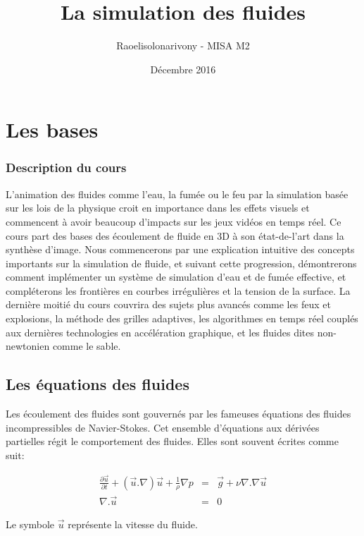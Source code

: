 \documentclass[11pt]{report}
\title{La simulation des fluides}
\author{Raoelisolonarivony - MISA M2}
\date{Décembre 2016}
\begin{document}
\maketitle
\part{Les bases}

\section*{Description du cours}

L'animation des fluides comme l'eau, la fumée ou le feu par la simulation basée sur les lois de la physique croit en importance dans les effets visuels et commencent à avoir beaucoup d'impacts sur les jeux vidéos en temps réel. Ce cours part des bases des écoulement de fluide en 3D à son état-de-l'art dans la synthèse d'image. Nous commencerons par une explication intuitive des concepts importants sur la simulation de fluide, et suivant cette progression, démontrerons comment implémenter un système de simulation d'eau et de fumée effective, et compléterons les frontières en courbes irrégulières et  la tension de la surface. La dernière moitié du cours couvrira des sujets plus avancés comme les feux et explosions, la méthode des grilles adaptives, les algorithmes en temps réel couplés aux dernières technologies en accélération graphique, et les fluides dites non-newtonien comme le sable. 

\chapter{Les équations des fluides}
Les écoulement des fluides sont gouvernés par les fameuses équations des fluides incompressibles de Navier-Stokes. Cet ensemble d'équations aux dérivées partielles régit le comportement des fluides. Elles sont souvent écrites comme suit:

\begin{eqnarray}
\frac{\partial \overrightarrow{u}}{\partial t} + (\overrightarrow{u} . \nabla ) \overrightarrow{u} + \frac{1}{\rho} \nabla p & = & \overrightarrow{g} + \nu \nabla . \nabla \overrightarrow{u} \\
\nabla . \overrightarrow{u} & = & 0
\end{eqnarray}

Le symbole $ \overrightarrow{u} $ représente la vitesse du fluide. \newline
\end{document}
